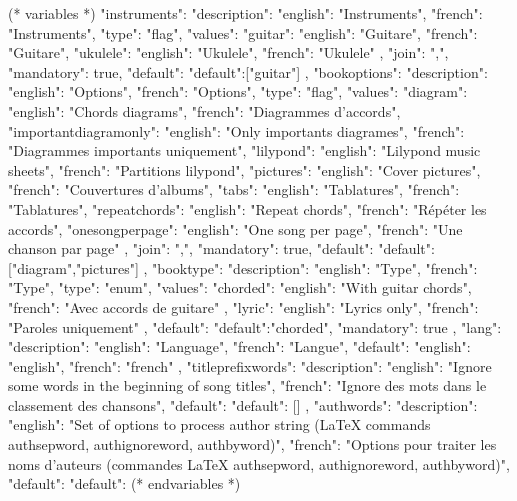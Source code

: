 (* variables *)
{
"instruments": {"description": {"english": "Instruments", "french": "Instruments"},
               "type": "flag",
               "values": {"guitar": {"english": "Guitare", "french": "Guitare"},
                          "ukulele": {"english": "Ukulele", "french": "Ukulele"}
                         },
               "join": ",",
               "mandatory": true,
               "default": {"default":["guitar"]}
            },
"bookoptions": {"description": {"english": "Options", "french": "Options"},
               "type": "flag",
               "values": {"diagram": {"english": "Chords diagrams", "french": "Diagrammes d'accords"},
                          "importantdiagramonly": {"english": "Only importants diagrames", "french": "Diagrammes importants uniquement"},
                          "lilypond": {"english": "Lilypond music sheets", "french": "Partitions lilypond"},
                          "pictures": {"english": "Cover pictures", "french": "Couvertures d'albums"},
                          "tabs": {"english": "Tablatures", "french": "Tablatures"},
                          "repeatchords": {"english": "Repeat chords", "french": "Répéter les accords"},
                          "onesongperpage": {"english": "One song per page", "french": "Une chanson par page"}
                       },
               "join": ",",
               "mandatory": true,
               "default": {"default":["diagram","pictures"]}
            },
"booktype": {"description": {"english": "Type", "french": "Type"},
            "type": "enum",
            "values": {"chorded": {"english": "With guitar chords", "french": "Avec accords de guitare" },
                                   "lyric": {"english": "Lyrics only", "french": "Paroles uniquement"}
                     },
            "default": {"default":"chorded"},
            "mandatory": true
            },
"lang": {"description": {"english": "Language", "french": "Langue"},
         "default": {"english": "english", "french": "french"}
      },
"titleprefixwords": {"description": {"english": "Ignore some words in the beginning of song titles",
                                     "french": "Ignore des mots dans le classement des chansons"},
                     "default": {"default": []}
                     },
"authwords": {"description": {"english": "Set of options to process author string (LaTeX commands authsepword, authignoreword, authbyword)",
                              "french": "Options pour traiter les noms d'auteurs (commandes LaTeX authsepword, authignoreword, authbyword)"},
               "default": {"default": {}}
               }
}
(* endvariables *)

